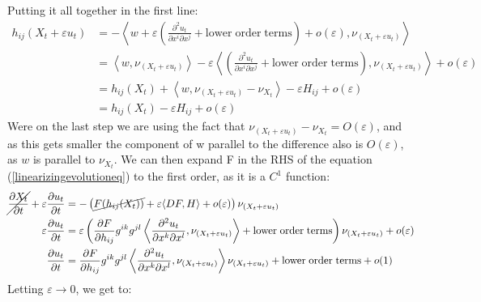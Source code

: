 Putting it all together in the first line:
\begin{align*}
	h_{ij}(X_t + \varepsilon u_t ) &=-\left\langle  w +\varepsilon\left(\frac{\partial^2 u_t}{\partial x^i \partial x^j} + \mathrm{lower \; order \;  terms}\right) + o(\varepsilon), \nu_{(X_t+\varepsilon u_t)}\right\rangle\\
	&= \left\langle  w, \nu_{(X_t+\varepsilon u_t)}\right\rangle -\varepsilon\left\langle  \left(\frac{\partial^2 u_t}{\partial x^i \partial x^j} + \mathrm{lower \; order \;  terms}\right), \nu_{(X_t+\varepsilon u_t)}\right\rangle + o(\varepsilon)\\
	&= h_{ij}(X_t) + \left\langle  w, \nu_{(X_t+\varepsilon u_t)}-\nu_{X_t}\right\rangle -\varepsilon H_{ij} + o(\varepsilon)\\
	&= h_{ij}(X_t) -\varepsilon H_{ij} + o(\varepsilon)
\end{align*}
Were on the last step we are using the fact that $\nu_{(X_t+\varepsilon u_t)}-\nu_{X_t} = O(\varepsilon)$, and as this gets smaller the component of w parallel to the difference also is $O(\varepsilon)$, as $w$ is parallel to $\nu_{X_t}$.
We can then expand F in the RHS of the equation (\ref{linearizingevolutioneq}) to the first order, as it is a $C^1$ function: 
\begin{align*}
	\cancel{\frac{\partial X_t}{\partial t}} + \varepsilon\frac{\partial u_t}{\partial t}  &= - \left(\cancel{F(h_{ij}(X_t)) }
	+ \varepsilon \langle DF, H\rangle + o(\varepsilon)\right)\nu_{(X_t+\varepsilon u_t)}\\
	\varepsilon\frac{\partial u_t}{\partial t}  &= \varepsilon\left(
	\frac{\partial F}{\partial h_{i j}} g^{i k}g^{jl}\left\langle \frac{\partial^2 u_t}{\partial x^k \partial x^l},  \nu_{(X_t+\varepsilon u_t)}\right\rangle + \mathrm{lower \; order \;  terms}\right)\nu_{(X_t+\varepsilon u_t)} + o(\varepsilon)\\
	\frac{\partial u_t}{\partial t}  &= 
	\frac{\partial F}{\partial h_{i j}} g^{i k}g^{jl}\left\langle \frac{\partial^2 u_t}{\partial x^k \partial x^l},  \nu_{(X_t+\varepsilon u_t)}\right\rangle \nu_{(X_t+\varepsilon u_t)} + \mathrm{lower \; order \;  terms} + o(1)
\end{align*}
Letting $\varepsilon\rightarrow 0$, we get to: 

